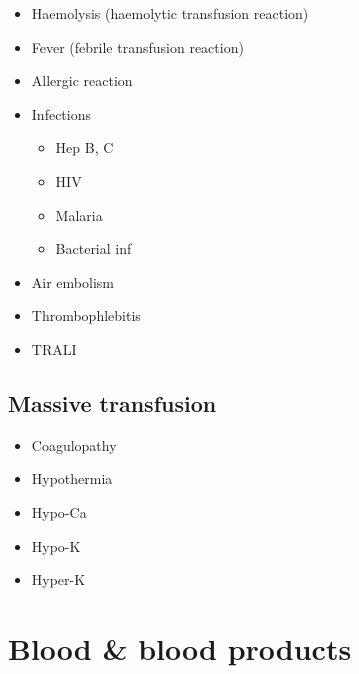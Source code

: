 \documentclass[
  14pt,
]{memoir}
\providecommand{\tightlist}{%
  \setlength{\itemsep}{0pt}\setlength{\parskip}{0pt}}
\begin{document}
\begin{itemize}
\tightlist
\item
  Haemolysis (haemolytic transfusion reaction)
\item
  Fever (febrile transfusion reaction)
\item
  Allergic reaction
\item
  Infections

  \begin{itemize}
  \tightlist
  \item
    Hep B, C
  \item
    HIV
  \item
    Malaria
  \item
    Bacterial inf
  \end{itemize}
\item
  Air embolism
\item
  Thrombophlebitis
\item
  TRALI
\end{itemize}

\hypertarget{massive-transfusion}{%
\subsection{Massive transfusion}\label{massive-transfusion}}

\begin{itemize}
\tightlist
\item
  Coagulopathy
\item
  Hypothermia
\item
  Hypo-Ca
\item
  Hypo-K
\item
  Hyper-K
\end{itemize}

\hypertarget{blood-blood-products}{%
\section{Blood \& blood products}\label{blood-blood-products}}
\end{document}
